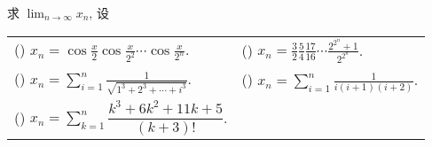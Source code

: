 \begin{example}
    求 $\displaystyle\lim_{n\to\infty}x_n$, 设
    \setcounter{magicrownumbers}{0}
    \begin{table}[H]
        \centering
        \begin{tabular}{l | l}
            (\rownumber{}) $\displaystyle x_n=\cos\frac{x}{2}\cos\frac{x}{2^2}\cdots\cos\frac{x}{2^n}$. & (\rownumber{}) $\displaystyle x_n=\frac{3}{2}\frac{5}{4}\frac{17}{16}\cdots\frac{2^{2^n}+1}{2^{2^n}}$. \\
            (\rownumber{}) $\displaystyle x_n=\sum_{i=1}^n\frac{1}{\sqrt{1^3+2^3+\cdots+i^3}}$.         & (\rownumber{}) $\displaystyle x_n=\sum_{i=1}^n\frac{1}{i(i+1)(i+2)}$.                                  \\
            (\rownumber{}) $\displaystyle x_n=\sum_{k=1}^{n} \dfrac{k^3+6k^2+11k+5}{(k+3)!}$.
        \end{tabular}
    \end{table}
\end{example}
